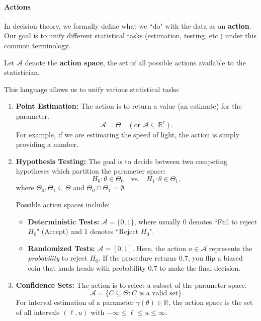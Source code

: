 \paragraph{Actions}
\label{subsec:actions}

In decision theory, we formally define what we ``do" with the data as an \textbf{action}. Our goal is to unify different statistical tasks (estimation, testing, etc.) under this common terminology.



Let \(\mathcal{A}\) denote the \textbf{action space}, the set of all possible actions available to the statistician.

\begin{ex}[]
    
This language allows us to unify various statistical tasks:

\begin{enumerate}[label=\roman*.]
    \item \textbf{Point Estimation:}
    The action is to return a value (an estimate) for the parameter.
    \[
    \mathcal{A} = \Theta \quad (\text{or } \mathcal{A} \subseteq \mathbb{R}^r).
    \]
    For example, if we are estimating the speed of light, the action is simply providing a number.

    \item \textbf{Hypothesis Testing:}
    The goal is to decide between two competing hypotheses which partition the parameter space:
    \[
    H_0: \theta \in \Theta_0 \quad \text{vs.} \quad H_1: \theta \in \Theta_1,
    \]
    where \(\Theta_0, \Theta_1 \subseteq \Theta\) and \(\Theta_0 \cap \Theta_1 = \emptyset\).
    
    

    Possible action spaces include:
    \begin{itemize}
        \item \textbf{Deterministic Tests:} \(\mathcal{A} = \{0, 1\}\), where usually \(0\) denotes ``Fail to reject \(H_0\)" (Accept) and \(1\) denotes ``Reject \(H_0\)".
        \item \textbf{Randomized Tests:} \(\mathcal{A} = [0, 1]\). Here, the action \(a \in \mathcal{A}\) represents the \textit{probability} to reject \(H_0\). If the procedure returns \(0.7\), you flip a biased coin that lands heads with probability \(0.7\) to make the final decision.
    \end{itemize}

    \item \textbf{Confidence Sets:}
    The action is to select a subset of the parameter space.
    \[
    \mathcal{A} = \{ C \subseteq \Theta : C \text{ is a valid set} \}.
    \]
    For interval estimation of a parameter \(\gamma(\theta) \in \mathbb{R}\), the action space is the set of all intervals \((\ell, u)\) with \(-\infty \le \ell \le u \le \infty\).
\end{enumerate}
\end{ex}

